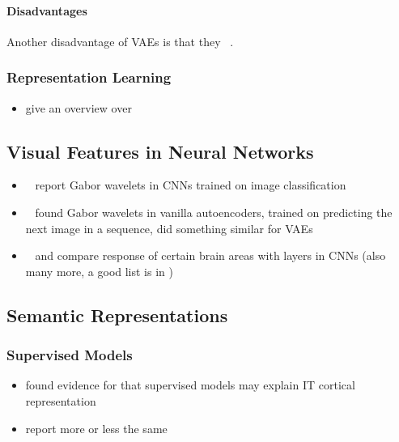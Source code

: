 \paragraph{Disadvantages}
Another disadvantage of \acp{VAE} is that they ~\citep[p. 694]{Goodfellow-et-al-2016}.

\subsubsection{Representation Learning}
\begin{itemize}
    \item \citet{tschannen2018recent} give an overview over 
\end{itemize}

\subsection{Visual Features in Neural Networks}\label{subsec:visual_features_in_neural_networks}
\begin{itemize}
    \item~\citet{krizhevsky2012imagenet} report Gabor wavelets in \acp{CNN} trained on image classification
    \item~\citet{palm2012prediction} found Gabor wavelets in vanilla autoencoders, trained on predicting the next image in a sequence, \citet{walker2016uncertain} did something similar for VAEs
    \item~\citet{eickenberg2017seeing} and \citet{wen2018neural} compare response of certain brain areas with layers in CNNs (also many more, a good list is in \citet{wen2018neural})
\end{itemize}

\subsection{Semantic Representations}\label{subsec:semantic-representations}

\subsubsection{Supervised Models}
\begin{itemize}
    \item \citet{khaligh2014deep} found evidence for that supervised models may explain \ac{IT} cortical representation
    \item \citet{cadieu2014deep} report more or less the same
\end{itemize}

